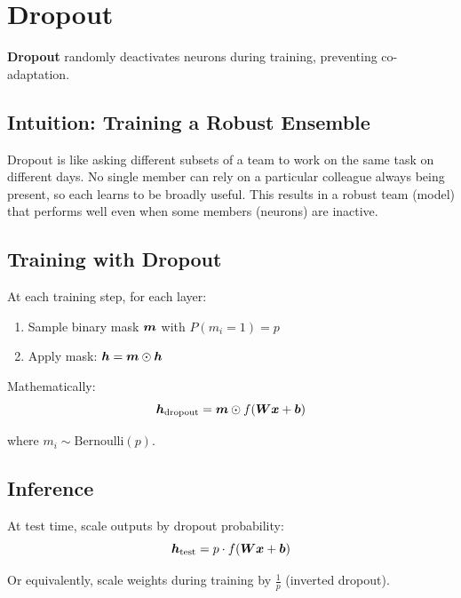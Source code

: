 
\section{Dropout}
\label{sec:dropout}

\textbf{Dropout} randomly deactivates neurons during training, preventing co-adaptation.

\subsection{Intuition: Training a Robust Ensemble}

Dropout is like asking different subsets of a team to work on the same task on different days. No single member can rely on a particular colleague always being present, so each learns to be broadly useful. This results in a robust team (model) that performs well even when some members (neurons) are inactive.

\subsection{Training with Dropout}

At each training step, for each layer:
\begin{enumerate}
    \item Sample binary mask $\boldsymbol{m}$ with $P(m_i = 1) = p$
    \item Apply mask: $\boldsymbol{h} = \boldsymbol{m} \odot \boldsymbol{h}$
\end{enumerate}

Mathematically:
\begin{equation}
\boldsymbol{h}_{\text{dropout}} = \boldsymbol{m} \odot f(\boldsymbol{W}\boldsymbol{x} + \boldsymbol{b})
\end{equation}

where $m_i \sim \text{Bernoulli}(p)$.

\subsection{Inference}

At test time, scale outputs by dropout probability:
\begin{equation}
\boldsymbol{h}_{\text{test}} = p \cdot f(\boldsymbol{W}\boldsymbol{x} + \boldsymbol{b})
\end{equation}

Or equivalently, scale weights during training by $\frac{1}{p}$ (inverted dropout).

